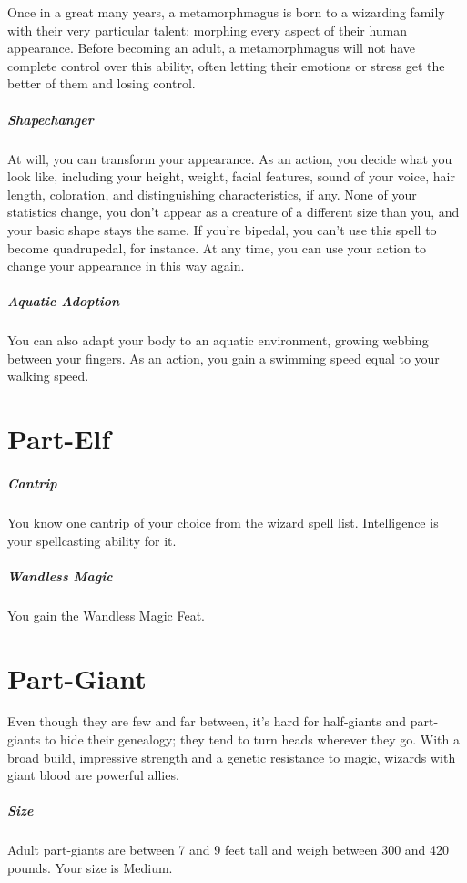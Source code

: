 \documentclass[a4paper,twocolumn,openany,nodeprecatedcode]{dndbook}
\begin{document}
        Once in a great many years, a metamorphmagus is born to a wizarding family with their very particular talent: morphing every aspect of their human appearance. Before becoming an adult, a metamorphmagus will not have complete control over this ability, often letting their emotions or stress get the better of them and losing control.

        \subparagraph{Shapechanger} At will, you can transform your appearance. As an action, you decide what you look like, including your height, weight, facial features, sound of your voice, hair length, coloration, and distinguishing characteristics, if any. None of your statistics change, you don't appear as a creature of a different size than you, and your basic shape stays the same. If you're bipedal, you can't use this spell to become quadrupedal, for instance. At any time, you can use your action to change your appearance in this way again.

        \subparagraph{Aquatic Adoption} You can also adapt your body to an aquatic environment, growing webbing between your fingers. As an action, you gain a swimming speed equal to your walking speed.


    \section{Part-Elf}

        \subparagraph{Cantrip} You know one cantrip of your choice from the wizard spell list. Intelligence is your spellcasting ability for it.

        \subparagraph{Wandless Magic} You gain the Wandless Magic Feat.


    \section{Part-Giant}

        Even though they are few and far between, it's hard for half-giants and part-giants to hide their genealogy; they tend to turn heads wherever they go. With a broad build, impressive strength and a genetic resistance to magic, wizards with giant blood are powerful allies.

        \subparagraph{Size} Adult part-giants are between 7 and 9 feet tall and weigh between 300 and 420 pounds. Your size is Medium.
\end{document}

